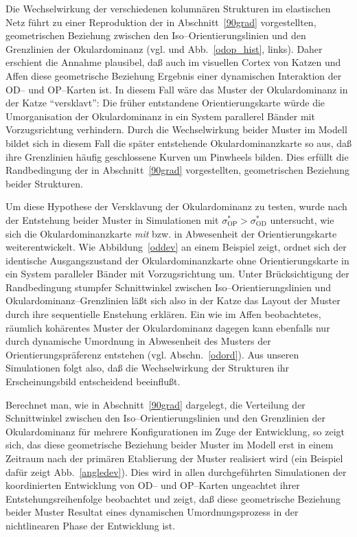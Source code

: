 Die Wechselwirkung der verschiedenen kolumnären Strukturen im elastischen
Netz führt zu einer Reproduktion der in Abschnitt~\ref{90grad}
vorgestellten, geometrischen Beziehung zwischen den
Iso--Orientierungslinien und den Grenzlinien der Okulardominanz
(vgl. \textcite{erwin:1995} und Abb.~\ref{odop_hist}, links). Daher
erschient die Annahme plausibel, daß auch im visuellen Cortex von Katzen
und Affen diese geometrische Beziehung Ergebnis einer dynamischen
Interaktion der OD-- und OP--Karten ist. In diesem Fall wäre das Muster
der Okulardominanz in der Katze ``versklavt'': Die früher entstandene
Orientierungskarte würde die Umorganisation der Okulardominanz in ein
System parallerel Bänder mit Vorzugsrichtung verhindern. Durch die
Wechselwirkung beider Muster im Modell bildet sich in diesem Fall die
später entstehende Okulardominanzkarte so aus, daß ihre Grenzlinien
häufig geschlossene Kurven um Pinwheels bilden. Dies erfüllt die
Randbedingung der in Abschnitt~\ref{90grad} vorgestellten, geometrischen
Beziehung beider Strukturen.

Um diese Hypothese der Versklavung der Okulardominanz zu testen, wurde nach
der Entstehung beider Muster in Simulationen mit
$\sigma^\ast_{\text{OP}}>\sigma^\ast_{\text{OD}}$ untersucht, wie sich die
Okulardominanzkarte \emph{mit} bzw. in Abwesenheit der Orientierungskarte
weiterentwickelt. Wie Abbildung~\ref{oddev} an einem Beispiel zeigt, ordnet
sich der identische Ausgangszustand der Okulardominanzkarte ohne
Orientierungskarte in ein System paralleler Bänder mit Vorzugsrichtung um.
Unter Brücksichtigung der Randbedingung stumpfer Schnittwinkel zwischen
Iso--Orientierungslinien und Okulardominanz--Grenzlinien läßt sich also
in der Katze das Layout der Muster durch ihre sequentielle Enstehung
erklären. Ein wie im Affen beobachtetes, räumlich kohärentes Muster der
Okulardominanz dagegen kann ebenfalls nur durch dynamische Umordnung in
Abwesenheit des Musters der Orientierungspräferenz entstehen
(vgl. Abschn.~\ref{odord}). Aus unseren Simulationen folgt also, daß die
Wechselwirkung der Strukturen ihr Erscheinungsbild entscheidend
beeinflußt.

Berechnet man, wie in Abschnitt~\ref{90grad} dargelegt, die Verteilung der
Schnittwinkel zwischen den Iso--Orientierungslinien und den Grenzlinien der
Okulardominanz für mehrere Konfigurationen im Zuge der Entwicklung, so
zeigt sich, das diese geometrische Beziehung beider Muster im Modell erst
in einem Zeitraum nach der primären Etablierung der Muster realisiert
wird (ein Beispiel dafür zeigt Abb.~\ref{angledev}). Dies wird in allen
durchgeführten Simulationen der koordinierten Entwicklung von OD-- und
OP--Karten ungeachtet ihrer Entstehungsreihenfolge beobachtet und zeigt,
daß diese geometrische Beziehung beider Muster Resultat eines dynamischen
Umordnungsprozess in der nichtlinearen Phase der Entwicklung ist.
